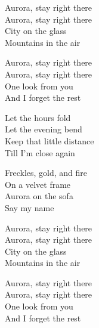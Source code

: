 \begin{lyrics}
Aurora, stay right there\\
Aurora, stay right there\\
City on the glass\\
Mountains in the air

Aurora, stay right there\\
Aurora, stay right there\\
One look from you\\
And I forget the rest

Let the hours fold\\
Let the evening bend\\
Keep that little distance\\
Till I’m close again

Freckles, gold, and fire\\
On a velvet frame\\
Aurora on the sofa\\
Say my name

Aurora, stay right there\\
Aurora, stay right there\\
City on the glass\\
Mountains in the air

Aurora, stay right there\\
Aurora, stay right there\\
One look from you\\
And I forget the rest
\end{lyrics}
